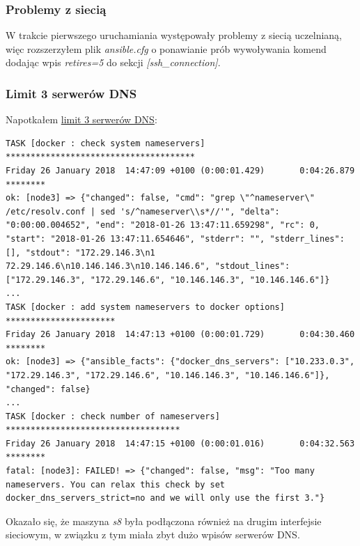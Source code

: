 \documentclass[a4paper,12pt,twoside,openany]{report}
\begin{document}
\hypertarget{problemy-z-sieciux105}{%
\subsubsection{Problemy z siecią}\label{problemy-z-sieciux105}}

W trakcie pierwszego uruchamiania występowały problemy z siecią
uczelnianą, więc rozszerzyłem plik \emph{ansible.cfg} o ponawianie prób
wywoływania komend dodając wpis \emph{retires=5} do sekcji
\emph{{[}ssh\_connection{]}}.

\hypertarget{limit-3-serweruxf3w-dns}{%
\subsubsection{Limit 3 serwerów DNS}\label{limit-3-serweruxf3w-dns}}

Napotkałem
\href{https://github.com/kubernetes-incubator/kubespray/blob/master/docs/dns-stack.md\#limitations}{limit
3 serwerów DNS}:

\begin{lstlisting}
TASK [docker : check system nameservers] **************************************
Friday 26 January 2018  14:47:09 +0100 (0:00:01.429)       0:04:26.879 ******** 
ok: [node3] => {"changed": false, "cmd": "grep \"^nameserver\" /etc/resolv.conf | sed 's/^nameserver\\s*//'", "delta": "0:00:00.004652", "end": "2018-01-26 13:47:11.659298", "rc": 0, "start": "2018-01-26 13:47:11.654646", "stderr": "", "stderr_lines": [], "stdout": "172.29.146.3\n1
72.29.146.6\n10.146.146.3\n10.146.146.6", "stdout_lines": ["172.29.146.3", "172.29.146.6", "10.146.146.3", "10.146.146.6"]}
...
TASK [docker : add system nameservers to docker options] **********************
Friday 26 January 2018  14:47:13 +0100 (0:00:01.729)       0:04:30.460 ******** 
ok: [node3] => {"ansible_facts": {"docker_dns_servers": ["10.233.0.3", "172.29.146.3", "172.29.146.6", "10.146.146.3", "10.146.146.6"]}, "changed": false}
...
TASK [docker : check number of nameservers] ***********************************
Friday 26 January 2018  14:47:15 +0100 (0:00:01.016)       0:04:32.563 ******** 
fatal: [node3]: FAILED! => {"changed": false, "msg": "Too many nameservers. You can relax this check by set docker_dns_servers_strict=no and we will only use the first 3."}
\end{lstlisting}

Okazało się, że maszyna \emph{s8} była podłączona również na drugim
interfejsie sieciowym, w związku z tym miała zbyt dużo wpisów serwerów
DNS.
\end{document}
